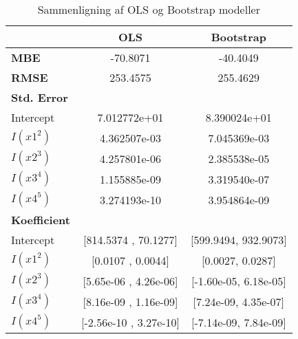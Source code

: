 \begin{table}
	\centering
	\caption{Sammenligning af OLS og Bootstrap modeller}
	\begin{tabular}{lcc}
		\hline
		& \textbf{OLS} & \textbf{Bootstrap} \\
		\hline
		\textbf{MBE} & -70.8071 & -40.4049 \\
		\textbf{RMSE} & 253.4575 & 255.4629 \\
		\hline
		\textbf{Std. Error}  \\
		\hline
		Intercept & 7.012772e+01 & 8.390024e+01 \\
		$I(x1^2)$ & 4.362507e-03 & 7.045369e-03 \\
		$I(x2^3)$ & 4.257801e-06 & 2.385538e-05 \\
		$I(x3^4)$ & 1.155885e-09 & 3.319540e-07 \\
		$I(x4^5)$ & 3.274193e-10 & 3.954864e-09 \\
		\hline
		\textbf{Koefficient}  \\
		\hline
		Intercept & [814.5374 , 70.1277] & [599.9494, 932.9073] \\
		$I(x1^2)$ & [0.0107 , 0.0044] & [0.0027, 0.0287] \\
		$I(x2^3)$ & [5.65e-06 , 4.26e-06] & [-1.60e-05, 6.18e-05] \\
		$I(x3^4)$ & [8.16e-09 , 1.16e-09] & [7.24e-09, 4.35e-07] \\
		$I(x4^5)$ & [-2.56e-10 , 3.27e-10] & [-7.14e-09, 7.84e-09] \\
		\hline
	\end{tabular}
\end{table}
